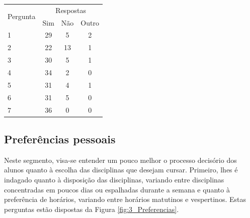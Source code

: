         \begin{table}[]
            \centering
            \label{table:2_satisfacao}
            \begin{tabular}{@{}|lccc|@{}}
                \toprule
                \multicolumn{1}{|c|}{\multirow{2}{*}{Pergunta}} & \multicolumn{3}{c|}{Respostas}                              \\
                \multicolumn{1}{|c|}{}                          & \multicolumn{1}{c|}{Sim} & \multicolumn{1}{c|}{Não} & Outro \\ \midrule
                1                                               &                      29  &                        5 &     2 \\ \midrule
                2                                               &                      22  &                       13 &     1 \\ \midrule
                3                                               &                      30  &                        5 &     1 \\ \midrule
                4                                               &                      34  &                        2 &     0 \\ \midrule
                5                                               &                      31  &                        4 &     1 \\ \midrule
                6                                               &                      31  &                        5 &     0 \\ \midrule
                7                                               &                      36  &                        0 &     0 \\ \bottomrule
            \end{tabular}
        \end{table}

    \subsection{Preferências pessoais} %

        Neste segmento, visa-se entender um pouco melhor o processo decisório dos alunos quanto à escolha das disciplinas que desejam cursar. Primeiro, lhes é indagado quanto à disposição das disciplinas, variando entre disciplinas concentradas em poucos dias ou espalhadas durante a semana e quanto à preferência de horários, variando entre horários matutinos e vespertinos. Estas perguntas estão dispostas da Figura \ref{fig:3_Preferencias}.

